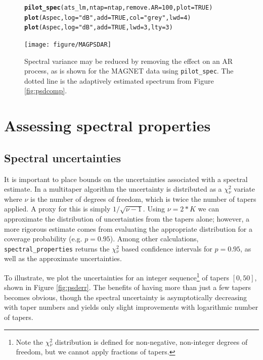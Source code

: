 \documentclass{article}\usepackage{graphicx, color}
\makeatletter
\newcommand{\hlfunctioncall}[1]{\textcolor[rgb]{0.501960784313725,0,0.329411764705882}{\textbf{#1}}}%
\newcommand{\hlstring}[1]{\textcolor[rgb]{0.6,0.6,1}{#1}}%
\newenvironment{kframe}{%
 \def\at@end@of@kframe{}%
 \ifinner\ifhmode%
  \def\at@end@of@kframe{\end{minipage}}%
  \begin{minipage}{\columnwidth}%
 \fi\fi%
 \def\FrameCommand##1{\hskip\@totalleftmargin \hskip-\fboxsep
 \colorbox{shadecolor}{##1}\hskip-\fboxsep
     \hskip-\linewidth \hskip-\@totalleftmargin \hskip\columnwidth}%
 \MakeFramed {\advance\hsize-\width
   \@totalleftmargin\z@ \linewidth\hsize
   \@setminipage}}%
 {\par\unskip\endMakeFramed%
 \at@end@of@kframe}
\newenvironment{knitrout}{}{} %
\newcommand{\Rcmd}[1]{\texttt{#1}}
\makeatother
\begin{document}
\begin{figure}[htb!]
\begin{center}
\begin{knitrout}
\color{fgcolor}\begin{kframe}
\begin{alltt}
\hlfunctioncall{pilot_spec}(ats_lm, ntap = ntap, remove.AR = 100, plot = TRUE)
\hlfunctioncall{plot}(Aspec, log = \hlstring{"dB"}, add = TRUE, col = \hlstring{"grey"}, lwd = 4)
\hlfunctioncall{plot}(Aspec, log = \hlstring{"dB"}, add = TRUE, lwd = 3, lty = 3)
\end{alltt}
\end{kframe}
\texttt{[image: figure/MAGPSDAR]} 

\end{knitrout}

\caption{Spectral variance may be reduced by removing the effect
on an AR process, as is shown for the MAGNET data using
\Rcmd{pilot\_spec}.  The dotted line is the adaptively estimated spectrum
from Figure \ref{fig:psdcomp}.}
\label{fig:arspecvar}
\end{center}
\end{figure}

\section{Assessing spectral properties}
\subsection{Spectral uncertainties}
It is important to place bounds on the uncertainties associated
with a spectral estimate.
In a multitaper algorithm the uncertainty is distributed as
a $\chi{}_{\nu}^2$ variate where $\nu$ is
the number of degrees of freedom, which is twice the
number of tapers applied.
A proxy for this is simply $1/\sqrt{\nu - 1}$.
Using $\nu = 2*K$ we can approximate the distribution
of uncertainties from the tapers alone; however, a more
rigorous estimate comes from evaluating the appropriate 
distribution  for a coverage probability (e.g. $p=0.95$).
Among other calculations, \Rcmd{spectral\_properties} returns the 
$\chi{}_{\nu}^2$ based confidence intervals for $p=0.95$, as well as the
approximate uncertainties.  

To illustrate, we 
plot the uncertainties for an integer sequence\footnote{
Note the $\chi{}_{\nu}^2$ distribution is defined for non-negative,
non-integer degrees of freedom, but we cannot apply
fractions of tapers.} of tapers $[0, 50]$, shown in
Figure \ref{fig:psderr}.  The benefits of having more than just
a few tapers becomes obvious, though the spectral uncertainty
is asymptotically decreasing with taper numbers and yields
only slight improvements with logarithmic number of tapers.
\end{document}
